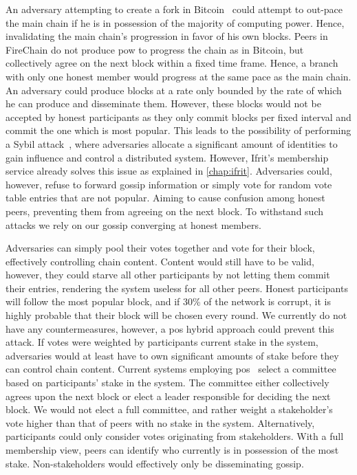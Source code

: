 \documentclass[USenglish]{uit-thesis}
\begin{document}
An adversary attempting to create a fork in Bitcoin~\cite{bitcoin} could attempt to out-pace the main chain if he is in possession of the majority of computing power.
Hence, invalidating the main chain's progression in favor of his own blocks.
Peers in FireChain do not produce \gls{pow} to progress the chain as in Bitcoin, but collectively agree on the next block within a fixed time frame.
Hence, a branch with only one honest member would progress at the same pace as the main chain.
An adversary could produce blocks at a rate only bounded by the rate of which he can produce and disseminate them.
However, these blocks would not be accepted by honest participants as they only commit blocks per fixed interval and commit the one which is most popular.
This leads to the possibility of performing a Sybil attack~\cite{sybil}, where adversaries allocate a significant amount of identities to gain influence and control a distributed system.
However, Ifrit's membership service already solves this issue as explained in \autoref{chap:ifrit}.
Adversaries could, however, refuse to forward gossip information or simply vote for random vote table entries that are not popular.
Aiming to cause confusion among honest peers, preventing them from agreeing on the next block.
To withstand such attacks we rely on our gossip converging at honest members.

Adversaries can simply pool their votes together and vote for their block, effectively controlling chain content.
Content would still have to be valid, however, they could starve all other participants by not letting them commit their entries, rendering the system useless for all other peers.
Honest participants will follow the most popular block, and if 30\% of the network is corrupt, it is highly probable that their block will be chosen every round.
We currently do not have any countermeasures, however, a \gls{pos} hybrid approach could prevent this attack.
If votes were weighted by participants current stake in the system, adversaries would at least have to own significant amounts of stake before they can control chain content.
Current systems employing \gls{pos} \cite{algorand, provepos} select a committee based on participants' stake in the system.
The committee either collectively agrees upon the next block or elect a leader responsible for deciding the next block.
We would not elect a full committee, and rather weight a stakeholder's vote higher than that of peers with no stake in the system.
Alternatively, participants could only consider votes originating from stakeholders.
With a full membership view, peers can identify who currently is in possession of the most stake.
Non-stakeholders would effectively only be disseminating gossip.
\end{document}
